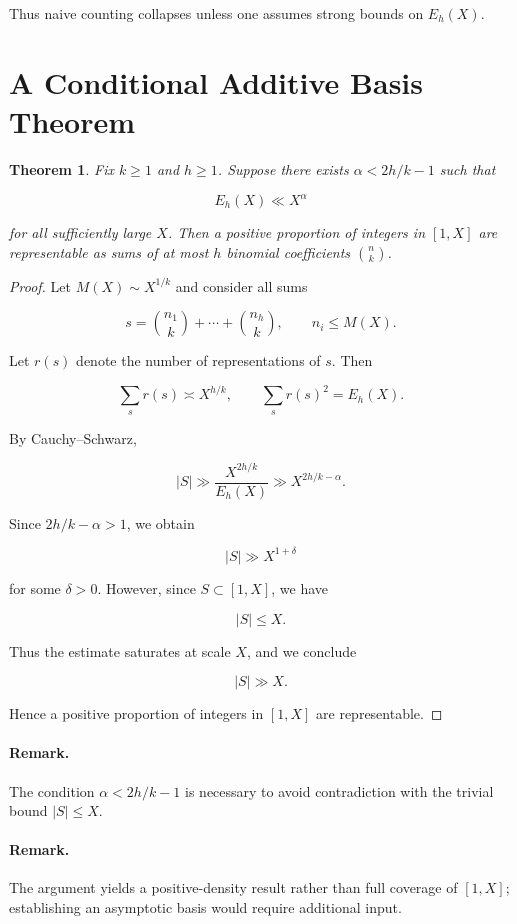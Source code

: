 \documentclass[11pt]{amsart}
\newtheorem{theorem}{Theorem}
\begin{document}
Thus naive counting collapses unless one assumes strong bounds on $E_h(X)$.

\section{A Conditional Additive Basis Theorem}

\begin{theorem}
Fix $k \ge 1$ and $h \ge 1$. Suppose there exists $\alpha < 2h/k - 1$ such that

\[
E_h(X) \ll X^\alpha
\]

for all sufficiently large $X$. Then a positive proportion of integers in $[1,X]$
are representable as sums of at most $h$ binomial coefficients $\binom{n}{k}$.
\end{theorem}

\begin{proof}
Let $M(X) \sim X^{1/k}$ and consider all sums

\[
s = \binom{n_1}{k} + \cdots + \binom{n_h}{k}, \qquad n_i \le M(X).
\]

Let $r(s)$ denote the number of representations of $s$. Then

\[
\sum_s r(s) \asymp X^{h/k}, \qquad \sum_s r(s)^2 = E_h(X).
\]

By Cauchy--Schwarz,

\[
|S| \gg \frac{X^{2h/k}}{E_h(X)} \gg X^{2h/k - \alpha}.
\]

Since $2h/k - \alpha > 1$, we obtain

\[
|S| \gg X^{1+\delta}
\]

for some $\delta > 0$. However, since $S \subset [1,X]$, we have

\[
|S| \le X.
\]

Thus the estimate saturates at scale $X$, and we conclude

\[
|S| \gg X.
\]

Hence a positive proportion of integers in $[1,X]$ are representable.
\end{proof}

\paragraph{Remark.}
The condition $\alpha < 2h/k - 1$ is necessary to avoid contradiction with the
trivial bound $|S| \le X$.

\paragraph{Remark.}
The argument yields a positive-density result rather than full coverage of
$[1,X]$; establishing an asymptotic basis would require additional input.
\end{document}

